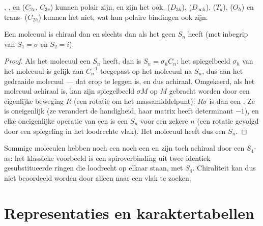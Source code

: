 \begin{example}\label{ex:b3:point-groups:polar}
, ,  en  ($C_{2v}$, $C_{3v}$) kunnen polair zijn,
en zijn het ook.  ($D_{3h}$),  ($D_{\infty h}$),  ($T_d$),  ($O_h$)
en trans- ($C_{2h}$) kunnen het niet, wat hun polaire bindingen ook zijn.
\end{example}

\begin{theorem}\label{thm:b3:point-groups:chiral}
Een molecuul is chiraal dan en slechts dan als het geen  $S_n$ heeft
(met inbegrip van $S_1 = \sigma$ en $S_2 = i$).
\end{theorem}

\begin{proof}
Als het molecuul een $S_n$ heeft, dan is $S_n = \sigma_hC_n$: het spiegelbeeld $\sigma_h$
van het molecuul is gelijk aan $C_n^{-1}$ toegepast op het molecuul na $S_n$, dus
aan het gedraaide molecuul --- dat erop te leggen is, en dus achiraal. Omgekeerd, als het
molecuul achiraal is, kan zijn spiegelbeeld $\sigma M$ op $M$ gebracht
worden door een eigenlijke beweging $R$ (een rotatie om het
massamiddelpunt): $R\sigma$ is dan een
. Ze is oneigenlijk (ze verandert de handigheid, haar
matrix heeft determinant $-1$), en elke oneigenlijke operatie van een
 is een
$S_n$ voor een zekere $n$ (een rotatie gevolgd door een spiegeling in het
loodrechte vlak). Het molecuul heeft dus een $S_n$.
\end{proof}

\begin{example}\label{ex:b3:point-groups:s4}
Sommige moleculen hebben noch een  noch een  en
zijn toch achiraal door een $S_4$-as: het klassieke voorbeeld is een
spiroverbinding uit twee identiek gesubstitueerde ringen die loodrecht op
elkaar staan, met  $S_4$. Chiraliteit kan dus niet beoordeeld
worden door alleen naar een vlak te zoeken.
\end{example}

\section{Representaties en karaktertabellen}

